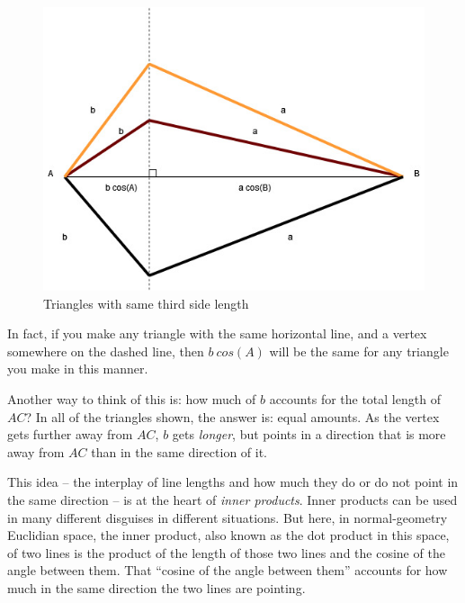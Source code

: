 \documentclass[
]{book}
\begin{document}
\begin{figure}

{\centering \includegraphics[width=0.75\linewidth,height=0.75\textheight]{images/Triangles-bcosA} 

}

\caption{Triangles with same third side length}\label{fig:unnamed-chunk-13}
\end{figure}

In fact, if you make any triangle with the same horizontal line, and a vertex somewhere on the dashed line, then \(b\ cos(A)\) will be the same for any triangle you make in this manner.

Another way to think of this is: how much of \(b\) accounts for the total length of \(AC\)? In all of the triangles shown, the answer is: equal amounts. As the vertex gets further away from \(AC\), \(b\) gets \emph{longer}, but points in a direction that is more away from \(AC\) than in the same direction of it.

This idea -- the interplay of line lengths and how much they do or do not point in the same direction -- is at the heart of \emph{inner products}. Inner products can be used in many different disguises in different situations. But here, in normal-geometry Euclidian space, the inner product, also known as the dot product in this space, of two lines is the product of the length of those two lines and the cosine of the angle between them. That ``cosine of the angle between them'' accounts for how much in the same direction the two lines are pointing.
\end{document}
